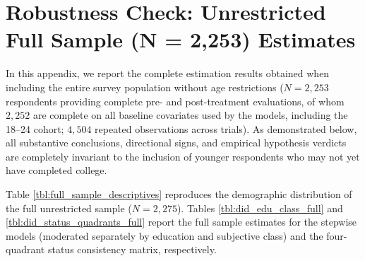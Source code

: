 \documentclass[12pt, letterpaper]{article}
\begin{document}
\section{Robustness Check: Unrestricted Full Sample (N = 2,253) Estimates}
\label{sec:appendix_full_sample}
In this appendix, we report the complete estimation results obtained when including the entire survey population without age restrictions ($N = 2,253$ respondents providing complete pre- and post-treatment evaluations, of whom $2,252$ are complete on all baseline covariates used by the models, including the 18--24 cohort; $4,504$ repeated observations across trials). As demonstrated below, all substantive conclusions, directional signs, and empirical hypothesis verdicts are completely invariant to the inclusion of younger respondents who may not yet have completed college.

Table \ref{tbl:full_sample_descriptives} reproduces the demographic distribution of the full unrestricted sample ($N = 2,275$). Tables \ref{tbl:did_edu_class_full} and \ref{tbl:did_status_quadrants_full} report the full sample estimates for the stepwise models (moderated separately by education and subjective class) and the four-quadrant status consistency matrix, respectively.
\end{document}
